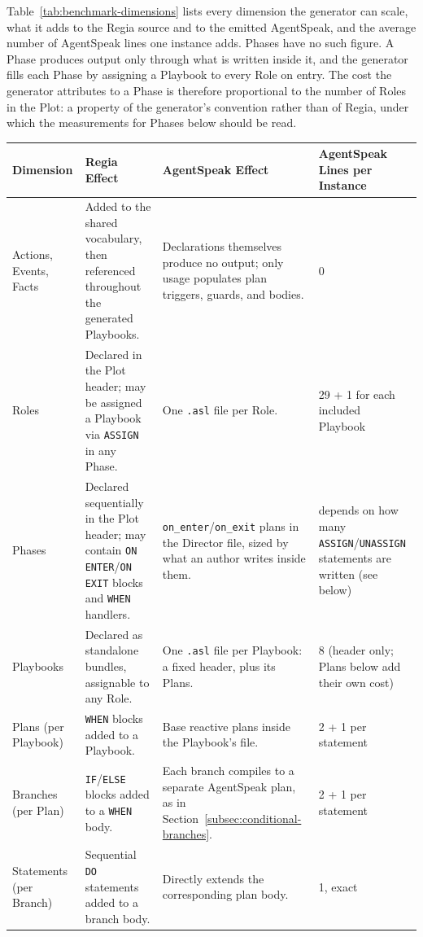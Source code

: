 Table~\ref{tab:benchmark-dimensions} lists every dimension the generator can scale, what it adds to the Regia source and to the emitted AgentSpeak, and the average number of AgentSpeak lines one instance adds. Phases have no such figure. A Phase produces output only through what is written inside it, and the generator fills each Phase by assigning a Playbook to every Role on entry. The cost the generator attributes to a Phase is therefore proportional to the number of Roles in the Plot: a property of the generator's convention rather than of Regia, under which the measurements for Phases below should be read.

\begin{table}[htpb]
\centering
\small
\begin{tabular}{|p{2.0cm}|p{4.0cm}|p{4.4cm}|p{3.0cm}|}
\hline
\textbf{Dimension} & \textbf{Regia Effect} & \textbf{AgentSpeak Effect} & \textbf{AgentSpeak Lines per Instance} \\
\hline
Actions, Events, Facts & Added to the shared vocabulary, then referenced throughout the generated Playbooks. & Declarations themselves produce no output; only usage populates plan triggers, guards, and bodies. & 0 \\
\hline
Roles & Declared in the Plot header; may be assigned a Playbook via \lstinline|ASSIGN| in any Phase. & One \lstinline|.asl| file per Role. & 29 + 1 for each included Playbook \\
\hline
Phases & Declared sequentially in the Plot header; may contain \lstinline|ON ENTER|/\lstinline|ON EXIT| blocks and \lstinline|WHEN| handlers. & \lstinline|on_enter|/\lstinline|on_exit| plans in the Director file, sized by what an author writes inside them. & depends on how many \lstinline|ASSIGN|/\lstinline|UNASSIGN| statements are written (see below) \\
\hline
Playbooks & Declared as standalone bundles, assignable to any Role. & One \lstinline|.asl| file per Playbook: a fixed header, plus its Plans. & 8 (header only; Plans below add their own cost) \\
\hline
Plans (per Playbook) & \lstinline|WHEN| blocks added to a Playbook. & Base reactive plans inside the Playbook's file. & 2 + 1 per statement \\
\hline
Branches (per Plan) & \lstinline|IF|/\lstinline|ELSE| blocks added to a \lstinline|WHEN| body. & Each branch compiles to a separate AgentSpeak plan, as in Section~\ref{subsec:conditional-branches}. & 2 + 1 per statement \\
\hline
Statements (per Branch) & Sequential \lstinline|DO| statements added to a branch body. & Directly extends the corresponding plan body. & 1, exact \\

\end{tabular}
\end{table}
